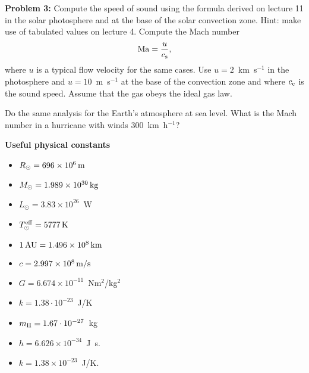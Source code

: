 \documentclass[12pt]{article}
\begin{document}
{\bf Problem 3:} Compute the speed of sound using the formula derived
on lecture 11 in the solar photosphere and at the base of the solar
convection zone. Hint: make use of tabulated values on lecture
4. Compute the Mach number
\begin{equation}
  {\rm Ma} = \frac{u}{c_{\rm s}},
\end{equation}
where $u$ is a typical flow velocity for the same cases. Use $u =
2$~km~s$^{-1}$ in the photosphere and $u=10$~m~s$^{-1}$ at the base of
the convection zone and where $c_{\rm c}$ is the sound speed. Assume
that the gas obeys the ideal gas law.

Do the same analysis for the Earth's atmosphere at sea level. What is
the Mach number in a hurricane with winds $300$~km~h$^{-1}$?


{\bf Useful physical constants}
\begin{itemize}
  \item $R_{\odot} = 696 \times 10^6\,{\rm m}$
  \item $M_{\odot} = 1.989 \times 10^{30}\,{\rm kg}$
  \item $L_{\odot} = 3.83 \times 10^{26}$~W
  \item $T^{\rm eff}_{\odot} = 5777\,{\rm K}$
  \item $1\,{\rm AU} = 1.496 \times 10^8\,{\rm km}$
  \item $c = 2.997 \times 10^8\,{\rm m/s}$
  \item $G = 6.674 \times 10^{-11}$~Nm$^2$/kg$^2$
  \item $k = 1.38\cdot10^{-23}$~J/K
  \item $m_{\rm H} = 1.67\cdot10^{-27}$~kg
  \item $h=6.626 \times 10^{-34}$~J~s.
  \item $k=1.38 \times 10^{-23}$~J/K.
\end{itemize}
\end{document}
